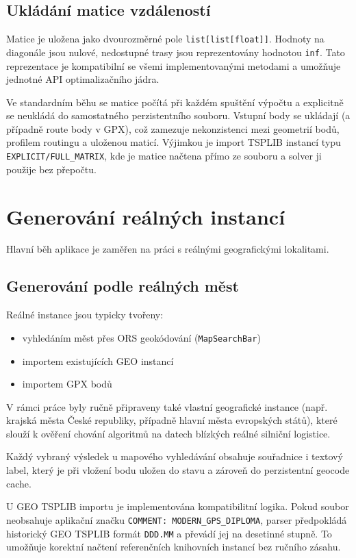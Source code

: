 \subsection{Ukládání matice vzdáleností}
Matice je uložena jako dvourozměrné pole \texttt{list[list[float]]}. Hodnoty na diagonále jsou nulové, nedostupné trasy jsou reprezentovány hodnotou \texttt{inf}. Tato reprezentace je kompatibilní se všemi implementovanými metodami a umožňuje jednotné API optimalizačního jádra.

Ve standardním běhu se matice počítá při každém spuštění výpočtu a explicitně se neukládá do samostatného perzistentního souboru. Vstupní body se ukládají (a případně route body v GPX), což zamezuje nekonzistenci mezi geometrií bodů, profilem routingu a uloženou maticí. Výjimkou je import TSPLIB instancí typu \texttt{EXPLICIT/FULL\_MATRIX}, kde je matice načtena přímo ze souboru a solver ji použije bez přepočtu.

\section{Generování reálných instancí}
Hlavní běh aplikace je zaměřen na práci s reálnými geografickými lokalitami.


\subsection{Generování podle reálných měst}
Reálné instance jsou typicky tvořeny:
\begin{itemize}
    \item vyhledáním měst přes ORS geokódování (\texttt{MapSearchBar})
    \item importem existujících GEO instancí
    \item importem GPX bodů
\end{itemize}

V rámci práce byly ručně připraveny také vlastní geografické instance (např. krajská města České republiky, případně hlavní města evropských států), které slouží k ověření chování algoritmů na datech blízkých reálné silniční logistice.

Každý vybraný výsledek u mapového vyhledávání obsahuje souřadnice i textový label, který je při vložení bodu uložen do stavu a zároveň do perzistentní geocode cache.

U GEO TSPLIB importu je implementována kompatibilitní logika. Pokud soubor neobsahuje aplikační značku \texttt{COMMENT: MODERN\_GPS\_DIPLOMA}, parser předpokládá historický GEO TSPLIB formát \texttt{DDD.MM} a převádí jej na desetinné stupně. To umožňuje korektní načtení referenčních knihovních instancí bez ručního zásahu.


